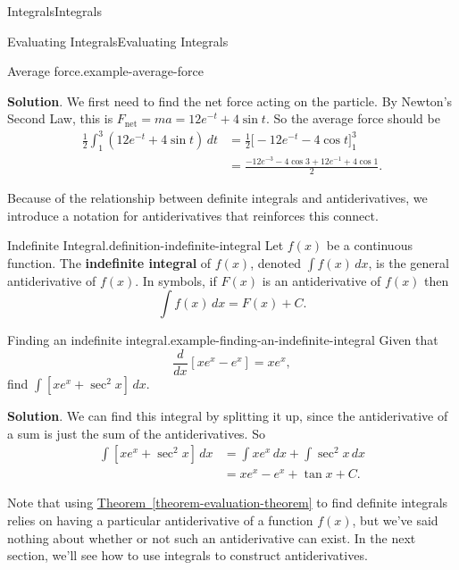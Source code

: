 \documentclass[10pt,]{book}
\newcommand{\terminology}[1]{\textbf{#1}}
\numberwithin{equation}{section}
\newcommand{\dv}[3][]{\dfrac{d^{#1} #2}{d #3^{#1}}}
\begin{document}
\begin{chapterptx}{Integrals}{}{Integrals}{}{}
\begin{sectionptx}{Evaluating Integrals}{}{Evaluating Integrals}{}{}
\begin{example}{Average force.}{example-average-force}
\par\smallskip%
\noindent\textbf{Solution}.\hypertarget{solution-99}{}\quad%
\hypertarget{p-454}{}%
We first need to find the net force acting on the particle. By Newton's Second Law, this is \(F_{\text{net}} = ma = 12e^{-t} + 4\sin t\). So the average force should be%
\begin{align*}
\frac{1}{2}\int_{1}^{3}(12e^{-t} + 4\sin t)\,dt & =  \frac{1}{2}\big[-12e^{-t} - 4\cos t\big]_{1}^{3}\\
& = \frac{-12e^{-3} - 4\cos 3 + 12e^{-1} + 4\cos1}{2}. 
\end{align*}
%
\end{example}
\hypertarget{p-455}{}%
Because of the relationship between definite integrals and antiderivatives, we introduce a notation for antiderivatives that reinforces this connect.%
\begin{definition}{Indefinite Integral.}{definition-indefinite-integral}%
\hypertarget{p-456}{}%
Let \(f(x)\) be a continuous function. The \terminology{indefinite integral} of \(f(x)\), denoted \(\int f(x)\,dx\), is the general antiderivative of \(f(x)\). In symbols, if \(F(x)\) is an antiderivative of \(f(x)\) then%
\begin{equation*}
\int f(x)\,dx = F(x) + C.
\end{equation*}
%
\end{definition}
\begin{example}{Finding an indefinite integral.}{example-finding-an-indefinite-integral}%
\hypertarget{p-457}{}%
Given that%
\begin{equation*}
\dv{}{x}[xe^{x} - e^{x}] = xe^{x},
\end{equation*}
find \(\int [xe^{x}+\sec^{2}x]\,dx\).%
\par\smallskip%
\noindent\textbf{Solution}.\hypertarget{solution-100}{}\quad%
\hypertarget{p-458}{}%
We can find this integral by splitting it up, since the antiderivative of a sum is just the sum of the antiderivatives. So%
\begin{align*}
\int[xe^{x} + \sec^{2}x]\,dx & = \int xe^{x}\,dx + \int\sec^{2}x\,dx \\
& = xe^{x}-e^{x} + \tan x + C. 
\end{align*}
%
\end{example}
\hypertarget{p-459}{}%
Note that using \hyperref[theorem-evaluation-theorem]{Theorem~\ref{theorem-evaluation-theorem}} to find definite integrals relies on having a particular antiderivative of a function \(f(x)\), but we've said nothing about whether or not such an antiderivative can exist. In the next section, we'll see how to use integrals to construct antiderivatives.%

\end{sectionptx}
\end{chapterptx}
\end{document}

